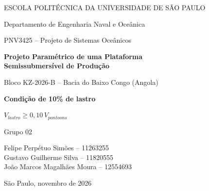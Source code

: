 \documentclass[11pt,a4paper]{article}
\newcommand{\integrantes}{Felipe Perpétuo Simões -- 11263255\\[2pt]
  Gustavo Guilherme Silva -- 11820555\\[2pt]
  João Marcos Magalhães Moura -- 12554693}
\newcommand{\Hz}{H_{1/3,z}}
\begin{document}
\begin{titlepage}
\centering
{\large ESCOLA POLITÉCNICA DA UNIVERSIDADE DE SÃO PAULO\par}
{\large Departamento de Engenharia Naval e Oceânica\par}
\vspace{2.5cm}
{\Large PNV3425 -- Projeto de Sistemas Oceânicos\par}
\vspace{1.2cm}
{\LARGE\bfseries Projeto Paramétrico de uma Plataforma\\[4pt] Semissubmersível de Produção\par}
\vspace{0.8cm}
{\Large Bloco KZ-2026-B -- Bacia do Baixo Congo (Angola)\par}
\vspace{0.6cm}
{\Large\bfseries Condição de 10\% de lastro\par}
\vspace{0.2cm}
{\large $V_{lastro} \ge 0{,}10\,V_{pontoons}$\par}
\vspace{2.0cm}
{\large Grupo 02\par}
\vspace{0.4cm}
{\normalsize \integrantes\par}
\vfill
{\large São Paulo, novembro de 2026\par}
\end{titlepage}

\begin{abstract}
Esta é a versão \emph{Condição de 10\% de lastro} do projeto paramétrico da semissubmersível de
produção do bloco KZ-2026-B, em 1.450~m de lâmina d'água na bacia do Baixo Congo. O modelo, os
dados e os objetivos são os mesmos do caso-base (mínimo peso estrutural do casco e mínimo $\Hz$
de \emph{heave}); a única diferença é uma restrição adicional obrigatória, $V_{lastro} \ge
0{,}10\,V_{pontoons}$, que reserva capacidade de lastro para ajuste de calado e de trim e para
compensar crescimento de peso. A otimização (20.000 amostras de hipercubo latino, soma
ponderada e $\varepsilon$-restrito com SLSQP e filtro de não dominância) produz uma fronteira de
Pareto de 23 pontos, entre 11.892~t ($\Hz = 2{,}36$~m) e 23.634~t ($\Hz = 1{,}04$~m). A solução
escolhida, no joelho da fronteira, tem $L_p = 107{,}5$~m, $T = 25{,}9$~m, casco de 16.026~t,
3.611~t de lastro, $\Hz = 1{,}55$~m, $T_n = 21{,}7$~s e $A/B = 1{,}303$. Em relação ao caso-base, o
casco fica 6,9\% mais pesado, o KG cai 4,44~m e o \emph{heave} praticamente não muda; o
deslocamento específico (285~t por mil bopd) passa ao nível da Troll C, a semissubmersível mais
enxuta do pôster de 2011.
\end{abstract}
\end{document}
